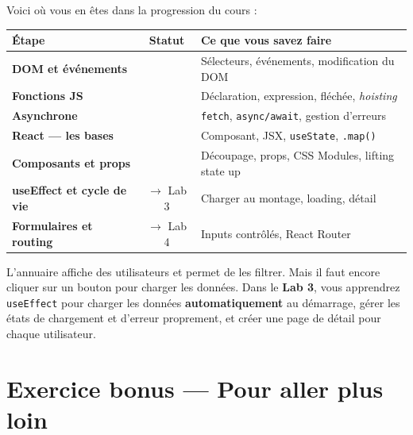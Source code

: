 \documentclass[11pt,a4paper]{article}
\newcommand{\cmark}{\ding{51}}
\begin{document}
Voici où vous en êtes dans la progression du cours :

\begin{center}
\begin{tabular}{lcp{7.5cm}}
\toprule
\textbf{Étape} & \textbf{Statut} & \textbf{Ce que vous savez faire} \\
\midrule
\textbf{DOM et événements} & \cmark{} & Sélecteurs, événements, modification du DOM \\
\textbf{Fonctions JS} & \cmark{} & Déclaration, expression, fléchée, \emph{hoisting} \\
\textbf{Asynchrone} & \cmark{} & \texttt{fetch}, \texttt{async/await}, gestion d'erreurs \\
\textbf{React --- les bases} & \cmark{} & Composant, JSX, \texttt{useState}, \texttt{.map()} \\
\textbf{Composants et props} & \cmark{} & Découpage, props, CSS Modules, lifting state up \\
\textbf{useEffect et cycle de vie} & $\to$ Lab 3 & Charger au montage, loading, détail \\
\textbf{Formulaires et routing} & $\to$ Lab 4 & Inputs contrôlés, React Router \\
\bottomrule
\end{tabular}
\end{center}

\begin{projetbox}[Et ensuite ?]
L'annuaire affiche des utilisateurs et permet de les filtrer. Mais il faut encore cliquer sur un bouton pour charger les données. Dans le \textbf{Lab 3}, vous apprendrez \texttt{useEffect} pour charger les données \textbf{automatiquement} au démarrage, gérer les états de chargement et d'erreur proprement, et créer une page de détail pour chaque utilisateur.
\end{projetbox}

\section*{Exercice bonus --- Pour aller plus loin}
\end{document}
